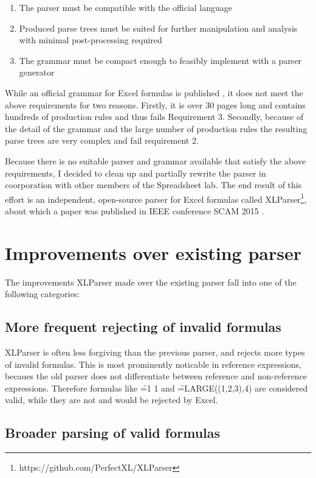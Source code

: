 \begin{enumerate}
\label{sec:designgoals}
\item The parser must be compatible with the official language
\item Produced parse trees must be suited for further manipulation and analysis with minimal post-processing required
\item The grammar must be compact enough to feasibly implement with a parser generator
\end{enumerate}

While an official grammar for Excel formulas is published \cite{ExcelOfficialGrammar}, it does not meet the above requirements for two reasons.
Firstly, it is over 30 pages long and contains hundreds of production rules and thus fails Requirement 3.
Secondly, because of the detail of the grammar and the large number of production rules the resulting parse trees are very complex and fail requirement 2.

Because there is no suitable parser and grammar available that satisfy the above requirements, I decided to clean up and partially rewrite the parser in coorporation with other members of the Spreadsheet lab.
The end result of this effort is an independent, open-source parser for Excel formulas called XLParser\footnote{https://github.com/PerfectXL/XLParser}, about which a paper was published in IEEE conference SCAM 2015 \cite{xlparser}.

\section{Improvements over existing parser}

The improvements XLParser made over the existing parser fall into one of the following categories:

\subsection{More frequent rejecting of invalid formulas}

XLParser is often less forgiving than the previous parser, and rejects more types of invalid formulas.
This is most prominently noticable in reference expressions, becaues the old parser does not differentiate between reference and non-reference expressions.
Therefore formulas like \f{=1 1} and \f{=LARGE((1,2,3),4)} are considered valid, while they are not and would be rejected by Excel.

\subsection{Broader parsing of valid formulas}

